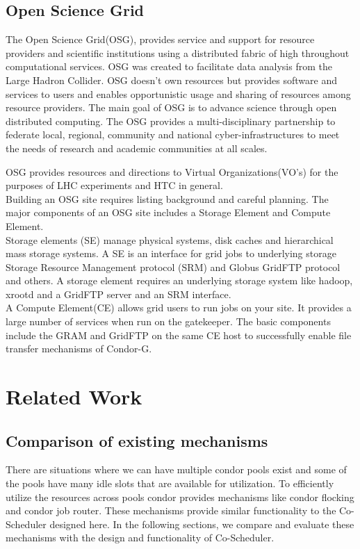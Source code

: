 \documentclass[ms,electronic,double]{nuthesis}
\begin{document}
\section{Open Science Grid} The Open Science Grid(OSG), provides service and support 
for resource providers and scientific institutions using a distributed fabric of 
high throughout computational services. OSG was created to facilitate data analysis from the 
Large Hadron Collider\cite{osg}. OSG doesn't own resources but provides software and services to 
users and enables opportunistic usage and sharing of resources among resource providers.
The main goal of OSG is to advance science through open distributed computing. 
The OSG provides a multi-disciplinary partnership to federate local, regional, community and 
national cyber-infrastructures to meet the needs of research and academic communities at all scales.

OSG provides resources and directions to Virtual Organizations(VO's) for the purposes of LHC experiments
and HTC in general. \\

Building an OSG site requires listing background and careful planning. The major 
components of an OSG site includes a Storage Element and Compute Element. \\
Storage elements (SE) manage physical systems, disk caches and hierarchical mass storage 
systems. A SE is an interface for grid jobs to underlying storage Storage Resource Management protocol (SRM) and Globus 
GridFTP protocol and others. A storage element requires an underlying storage system like hadoop, xrootd
and a GridFTP server and an SRM interface.\\
A Compute Element(CE) allows grid users to run jobs on your site. It provides a 
large number of services when run on the gatekeeper. The basic components include 
the GRAM and GridFTP on the same CE host to successfully enable file transfer 
mechanisms of Condor-G.\\


\chapter{Related Work}

\section{Comparison of existing mechanisms}
There are situations where we can have multiple condor pools exist and some of 
the pools have many idle slots that are available for utilization. To efficiently utilize the resources across pools condor provides 
mechanisms like condor flocking and condor job router. These mechanisms 
provide similar functionality to the Co-Scheduler designed here. In the following sections, we compare 
and evaluate these mechanisms with the design and functionality of Co-Scheduler.
\end{document}
